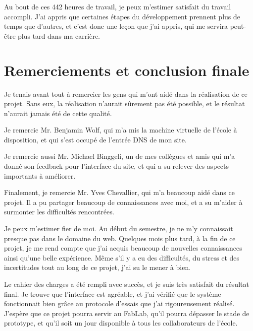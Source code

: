 \documentclass[
    iai, %
    eai, %
]{heig-tb}
\begin{document}
Au bout de ces 442 heures de travail, je peux m'estimer satisfait du travail accompli. J'ai appris que certaines étapes du développement prennent plus de temps que d'autres, et c'est donc une leçon que j'ai appris, qui me servira peut-être plus tard dans ma carrière.

\section{Remerciements et conclusion finale}
Je tenais avant tout à remercier les gens qui m'ont aidé dans la réalisation de ce projet. Sans eux, la réalisation n'aurait sûrement pas été possible, et le résultat n'aurait jamais été de cette qualité.

Je remercie Mr. Benjamin Wolf, qui m'a mis la machine virtuelle de l'école à disposition, et qui s'est occupé de l'entrée DNS de mon site.

Je remercie aussi Mr. Michael Binggeli, un de mes collègues et amis qui m'a donné son feedback pour l'interface du site, et qui a su relever des aspects importants à améliorer.

Finalement, je remercie Mr. Yves Chevallier, qui m'a beaucoup aidé dans ce projet. Il a pu partager beaucoup de connaissances avec moi, et a su m'aider à surmonter les difficultés rencontrées.

Je peux m'estimer fier de moi. Au début du semestre, je ne m'y connaissait presque pas dans le domaine du web. Quelques mois plus tard, à la fin de ce projet, je me rend compte que j'ai acquis beaucoup de nouvelles connaissances ainsi qu'une belle expérience. Même s'il y a eu des difficultés, du stress et des incertitudes tout au long de ce projet, j'ai su le mener à bien.

Le cahier des charges a été rempli avec succès, et je suis très satisfait du résultat final. Je trouve que l'interface est agréable, et j'ai vérifié que le système fonctionnait bien grâce au protocole d'essais que j'ai rigoureusement réalisé. J'espère que ce projet pourra servir au FabLab, qu'il pourra dépasser le stade de prototype, et qu'il soit un jour disponible à tous les collaborateurs de l'école.

\vfil
\hspace{8cm}\makeatletter\@author\makeatother\par
\hspace{8cm}\begin{minipage}{5cm}
  \printsignature
\end{minipage}
\clearpage
\end{document}
